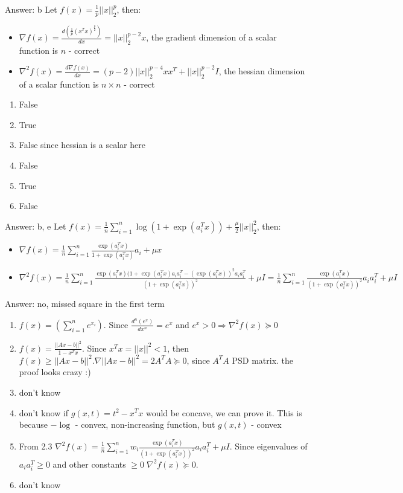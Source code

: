 \documentclass{homework}
\begin{document}
Answer: b
\exercise*[2.2]
Let $f(x) = \frac{1}{p}||x||_2^p$, then:
\begin{itemize}
	\item $\nabla f(x)=\frac{d(\frac{1}{p}(x^Tx)^{\frac{p}{2}})}{dx}=||x||_2^{p-2}x$, the gradient dimension of a scalar function is $n$ - correct
	\item $\nabla^2f(x)=\frac{d\nabla f(x)}{dx}=(p-2)||x||_2^{p-4}xx^T + ||x||_2^{p-2}I$, the hessian dimension of a scalar function is $n\times n$ - correct
\end{itemize}
\begin{enumerate}[label=\alph*)]
	\item False
	\item True
	\item False since hessian is a scalar here
	\item False
	\item True
	\item False
\end{enumerate}
Answer: b, e
\exercise*[2.3]
Let $f(x) = \frac{1}{n}\sum_{i=1}^n\log(1 + \exp(a_i^Tx)) + \frac{\mu}{2}||x||_2^2$, then:
\begin{itemize}
	\item $\nabla f(x) = \frac{1}{n}\sum_{i=1}^n\frac{\exp(a_i^Tx)}{1 + \exp(a_i^Tx)}a_i +\mu x$
	\item $\nabla^2 f(x) = \frac{1}{n}\sum_{i=1}^n\frac{\exp(a_i^Tx)(1 + \exp(a_i^Tx)a_ia_i^T - (\exp(a_i^Tx))^2a_ia_i^T}{(1 + \exp(a_i^Tx))^2} + \mu I=\frac{1}{n}\sum_{i=1}^n\frac{\exp(a_i^Tx)}{(1 + \exp(a_i^Tx))^2}a_ia_i^T + \mu I$
\end{itemize}
Answer: no, missed square in the first term
\exercise*[3]
\begin{enumerate}[label=\alph*)]
	\item $f(x)=(\sum_{i=1}^n e^{x_i})$. Since $\frac{d^n(e^x)}{dx^n}=e^x$ and $e^x > 0 \Rightarrow \nabla^2f(x)\succeq0$
	\item $f(x)=\frac{||Ax-b||^2}{1-x^Tx}$. Since $x^Tx = ||x||^2<1$, then $f(x) \geq ||Ax-b||^2. \nabla ||Ax-b||^2=2A^TA\succeq 0$, since $A^TA$ PSD matrix. the proof looks crazy :)
	\item don't know
	\item don't know if $g(x,t)=t^2 -x^Tx$ would be concave, we can prove it. This is because $-\log$ - convex, non-increasing function, but $g(x,t)$ - convex\newline
	\item From 2.3 $\nabla^2 f(x) = \frac{1}{n}\sum_{i=1}^nw_i\frac{\exp(a_i^Tx)}{(1 + \exp(a_i^Tx))^2}a_ia_i^T + \mu I$. Since eigenvalues of $a_ia_i^T \geq 0$ and other constants $\geq 0 \; \nabla^2 f(x) \succeq 0.$
	\item don't know
\end{enumerate}
\end{document}
